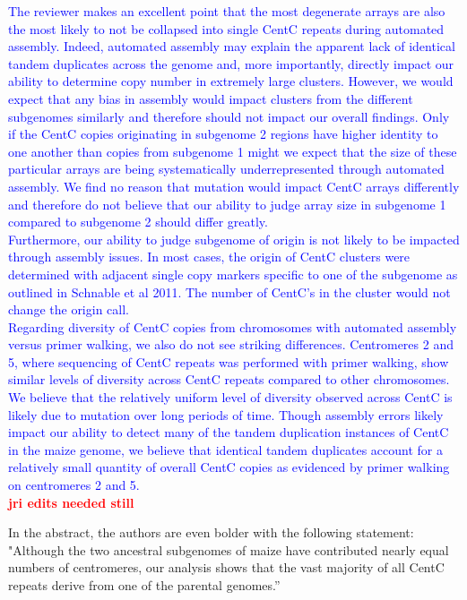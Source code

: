\documentclass[]{article}
\newcommand{\res}[1]{\noindent \textcolor{blue}{{#1}} \\}
\newcommand{\jri}[1]{\textcolor{red}{{\bf #1}} }
\begin{document}
\res{The reviewer makes an excellent point that the most degenerate arrays are also the most likely to not be collapsed into single CentC repeats during automated assembly.
Indeed, automated assembly may explain the apparent lack of identical tandem duplicates across the genome and, more importantly, directly impact our ability to determine copy number in extremely large clusters.  
However, we would expect that any bias in assembly would impact clusters from the different subgenomes similarly and therefore should not impact our overall findings.  
Only if the CentC copies originating in subgenome 2 regions have higher identity to one another than copies from subgenome 1 might we expect that the size of these particular arrays are being systematically underrepresented through automated assembly. 
We find no reason that mutation would impact CentC arrays differently and therefore do not believe that our ability to judge array size in subgenome 1 compared to subgenome 2 should differ greatly.}

\res{Furthermore, our ability to judge subgenome of origin is not likely to be impacted through assembly issues. In most cases, the origin of CentC clusters were determined with adjacent single copy markers specific to one of the subgenome as outlined in Schnable et al 2011.  The number of CentC's in the cluster would not change the origin call.}

\res{Regarding diversity of CentC copies from chromosomes with automated assembly versus primer walking, we also do not see striking differences.  
Centromeres 2 and 5, where sequencing of CentC repeats was performed with primer walking, show similar levels of diversity across CentC repeats compared to other chromosomes.  
We believe that the relatively uniform level of diversity observed across CentC is likely due to mutation over long periods of time.  
Though assembly errors likely impact our ability to detect many of the tandem duplication instances of CentC in the maize genome, we believe that identical tandem duplicates account for a relatively small quantity of overall CentC copies as evidenced by primer walking on centromeres 2 and 5. }\jri{jri edits needed still}

In the abstract, the authors are even bolder with the following statement: "Although the two ancestral subgenomes of maize have contributed nearly equal numbers of centromeres, our analysis shows that the vast majority of all CentC repeats derive from one of the parental genomes.”\\
\end{document}
